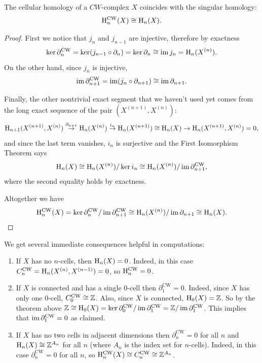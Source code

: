\begin{thm}
    The cellular homology of a $CW$-complex $X$ coincides with the singular homology:
    \[\mathrm{H}_n^{\mathrm{CW}}(X)\cong \mathrm{H}_n(X).\]
\end{thm}
\begin{proof}
    First we notice that $j_{n}$ and $j_{n-1}$ are injective, therefore by exactness
    \[\ker\partial_n^{\mathrm{CW}}=\ker (j_{n-1}\circ\partial_n)=\ker\partial_{n}\cong \operatorname{im} j_{n}=\mathrm{H}_n(X^{(n)}).\]
    On the other hand, since $j_{n}$ is injective,
    \[\operatorname{im} \partial_{n+1}^{\mathrm{CW}}=\operatorname{im} (j_n\circ\partial_{n+1})\cong \operatorname{im} \partial_{n+1}. \]

    Finally, the other nontrivial exact segment that we haven't used yet comes from the long exact sequence of the pair $(X^{(n+1)},X^{(n)})$:
    \[\mathrm{H}_{n+1}(X^{(n+1)},X^{(n)})\overset{\partial_{n+1}}{\to} \mathrm{H}_n(X^{(n)})\overset{i_n}{\to}\mathrm{H}_n(X^{(n+1)})\cong \mathrm{H}_n(X)\to \mathrm{H}_{n}(X^{(n+1)},X^{(n)})=0,\]
    and since the last term vanishes, $i_n$ is surjective and the First Isomorphism Theorem says
    \[\mathrm{H}_n(X)\cong \mathrm{H}_n(X^{(n)})\slash \ker i_n\cong \mathrm{H}_n(X^{(n)})\slash \operatorname{im} \partial_{n+1}^{\mathrm{CW}},\]
    where the second equality holds by exactness.
    
    Altogether we have
    \[\mathrm{H}_n^{\mathrm{CW}}(X)=\ker \partial_n^{\mathrm{CW}}\slash \operatorname{im} \partial_{n+1}^{\mathrm{CW}}\cong \mathrm{H}_n(X^{(n)})\slash \operatorname{im} \partial_{n+1}\cong \mathrm{H}_n(X).\]
\end{proof}

\begin{rem}
    We get several immediate consequences helpful in computations:
    \begin{enumerate}
        \item If $X$ has no $n$-cells, then $\mathrm{H}_n(X)=0$. Indeed, in this case $C^{\mathrm{CW}}_n=\mathrm{H}_n(X^{(n)},X^{(n-1)})=0$, so $\mathrm{H}_n^{\mathrm{CW}}=0$.
        \item If $X$ is connected and has a single $0$-cell then $\partial_1^{\mathrm{CW}}=0$. Indeed, since $X$ has only one $0$-cell, $C^{\mathrm{CW}}_0\cong \mathbb{Z}$. Also, since $X$ is connected, $\mathrm{H}_0(X)=\mathbb{Z}$. So by the theorem above $\mathbb{Z}\cong \mathrm{H}_0(X)=\ker \partial_0^{\mathrm{CW}}\slash \operatorname{im}\partial_1^{\mathrm{CW}}=\mathbb{Z}\slash \operatorname{im}\partial_1^{\mathrm{CW}}$. This implies that $\operatorname{im} \partial_1^{\mathrm{CW}}=0$ as claimed.
        \item If $X$ has no two cells in adjacent dimensions then $\partial_n^{\mathrm{CW}}=0$ for all $n$ and $\mathrm{H}_n(X)\cong \mathbb{Z}^{A_n}$ for all $n$ (where $A_n$ is the index set for $n$-cells). Indeed, in this case $\partial_n^{\mathrm{CW}}=0$ for all $n$, so $\mathrm{H}_n^{\mathrm{CW}}(X)\cong C_n^{\mathrm{CW}}\cong \mathbb{Z}^{A_n}$.
    \end{enumerate}
\end{rem}

